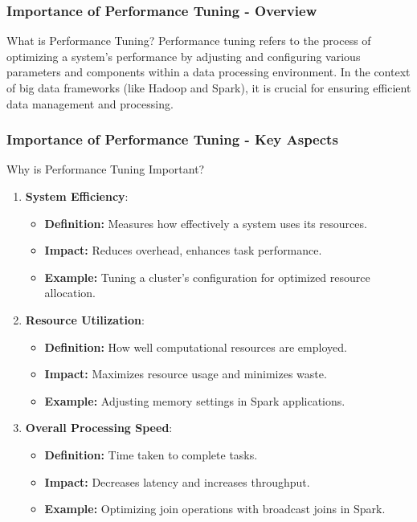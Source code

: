 \documentclass[aspectratio=169]{beamer}
\begin{document}
\begin{frame}[fragile]
    \frametitle{Importance of Performance Tuning - Overview}
    \begin{block}{What is Performance Tuning?}
        Performance tuning refers to the process of optimizing a system's performance by adjusting and configuring various parameters and components within a data processing environment. In the context of big data frameworks (like Hadoop and Spark), it is crucial for ensuring efficient data management and processing.
    \end{block}
\end{frame}

\begin{frame}[fragile]
    \frametitle{Importance of Performance Tuning - Key Aspects}
    \begin{block}{Why is Performance Tuning Important?}
        \begin{enumerate}
            \item \textbf{System Efficiency}:
                \begin{itemize}
                    \item \textbf{Definition:} Measures how effectively a system uses its resources.
                    \item \textbf{Impact:} Reduces overhead, enhances task performance.
                    \item \textbf{Example:} Tuning a cluster's configuration for optimized resource allocation.
                \end{itemize}
                
            \item \textbf{Resource Utilization}:
                \begin{itemize}
                    \item \textbf{Definition:} How well computational resources are employed.
                    \item \textbf{Impact:} Maximizes resource usage and minimizes waste.
                    \item \textbf{Example:} Adjusting memory settings in Spark applications.
                \end{itemize}
                
            \item \textbf{Overall Processing Speed}:
                \begin{itemize}
                    \item \textbf{Definition:} Time taken to complete tasks.
                    \item \textbf{Impact:} Decreases latency and increases throughput.
                    \item \textbf{Example:} Optimizing join operations with broadcast joins in Spark.
                \end{itemize}
        \end{enumerate}
    \end{block}
\end{frame}
\end{document}
